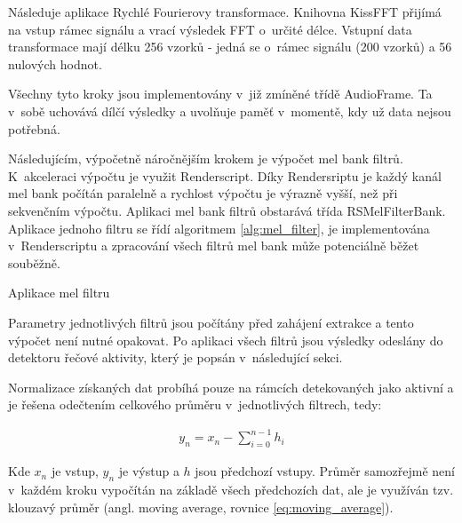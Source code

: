 Následuje aplikace Rychlé Fourierovy transformace. Knihovna KissFFT přijímá na vstup rámec signálu a vrací výsledek FFT o~určité délce. Vstupní data transformace mají délku 256 vzorků - jedná se o~rámec signálu (200 vzorků) a 56 nulových hodnot.

Všechny tyto kroky jsou implementovány v~již zmíněné třídě AudioFrame. Ta v~sobě uchovává dílčí výsledky a uvolňuje paměť v~momentě, kdy už data nejsou potřebná.

Následujícím, výpočetně náročnějším krokem je výpočet mel bank filtrů. K~akceleraci výpočtu je využit Renderscript. Díky Rendersriptu je každý kanál mel bank počítán paralelně a rychlost výpočtu je výrazně vyšší, než při sekvenčním výpočtu. Aplikaci mel bank filtrů obstarává třída RSMelFilterBank. Aplikace jednoho filtru se řídí algoritmem \ref{alg:mel_filter}, je implementována v~Renderscriptu a zpracování všech filtrů mel bank může potenciálně běžet souběžně.

\begin{center}
\begin{czechalgorithm}[H] \label{alg:mel_filter}

 \caption{Aplikace mel filtru}
\end{czechalgorithm}
\end{center}


Parametry jednotlivých filtrů jsou počítány před zahájení extrakce a tento výpočet není nutné opakovat. Po aplikaci všech filtrů jsou výsledky odeslány do detektoru řečové aktivity, který je popsán v~následující sekci. 

Normalizace získaných dat probíhá pouze na rámcích detekovaných jako aktivní a je řešena odečtením celkového průměru v~jednotlivých filtrech, tedy:

\begin{equation} \label{eq:mel_normalisation}
\begin{gathered}
y_n = x_n - \sum^{n - 1}_{i = 0}h_i
\end{gathered}
\end{equation}

Kde $x_n$ je vstup, $y_n$ je výstup a $h$ jsou předchozí vstupy. Průměr samozřejmě není v~každém kroku vypočítán na základě všech předchozích dat, ale je využíván tzv. klouzavý průměr (angl. moving average, rovnice \ref{eq:moving_average}).

